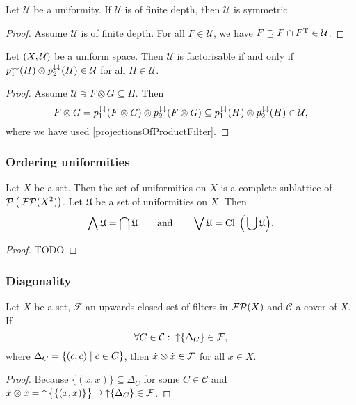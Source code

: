 \begin{lemma}
Let $\mathcal{U}$ be a uniformity. If $\mathcal{U}$ is of finite depth, then $\mathcal{U}$ is symmetric.
\end{lemma}
\begin{proof}
Assume $\mathcal{U}$ is of finite depth. For all $F\in\mathcal{U}$, we have $F\supseteq F\cap F^{\mathrm{T}} \in \mathcal{U}$.
\end{proof}

\begin{lemma}
Let $\left( X,\mathcal{U} \right)$ be a uniform space. Then $\mathcal{U}$ is factorisable \textup{if and only if} $p_1^{\downarrow\downarrow}(H)\otimes p_2^{\downarrow\downarrow}(H) \in \mathcal{U}$ for all $H\in\mathcal{U}$.
\end{lemma}
\begin{proof}
Assume $\mathcal{U} \ni F\otimes G \subseteq H$. Then
\[ F\otimes G = p_1^{\downarrow\downarrow}(F\otimes G)\otimes p_2^{\downarrow\downarrow}(F\otimes G) \subseteq p_1^{\downarrow\downarrow}(H)\otimes p_2^{\downarrow\downarrow}(H) \in \mathcal{U}, \]
where we have used \ref{projectionsOfProductFilter}.
\end{proof}

\subsubsection{Ordering uniformities}
\begin{proposition} \label{latticeOfUniformities}
Let $X$ be a set. Then the set of uniformities on $X$ is a complete sublattice of $\operatorname{\mathcal{P}}\big(\operatorname{\mathcal{FP}}(X^2)\big)$. Let $\mathfrak{U}$ be a set of uniformities on $X$. Then
\[ \bigwedge\mathfrak{U} = \bigcap\mathfrak{U} \qquad\text{and}\qquad \bigvee\mathfrak{U} = \operatorname{Cl}_{;}\Big(\bigcup\mathfrak{U}\Big). \]
\end{proposition}
\begin{proof}
TODO
\end{proof}

\subsubsection{Diagonality}
\begin{lemma}
Let $X$ be a set, $\mathcal{F}$ an upwards closed set of filters in $\operatorname{\mathcal{FP}}(X)$ and $\mathcal{C}$ a cover of $X$. If
\[ \forall C\in\mathcal{C}: \; \operatorname{\uparrow}\{\Delta_C\} \in \mathcal{F}, \]
where $\Delta_C = \left\{ (c,c) \;\middle|\; c\in C \right\}$, then $\dot{x}\otimes\dot{x}\in\mathcal{F}$ for all $x\in X$.
\end{lemma}
\begin{proof}
Because $\{(x,x)\}\subseteq \Delta_C$ for some $C\in\mathcal{C}$ and $\dot{x}\otimes\dot{x} = \operatorname{\uparrow} \big\{\{(x,x)\}\big\} \supseteq \operatorname{\uparrow}\{\Delta_C\} \in\mathcal{F}$.
\end{proof}

